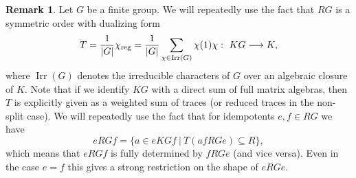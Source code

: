 \documentclass[11pt, a4paper]{amsart}
\theoremstyle{definition}
\theoremstyle{definition}
\newtheorem{remark}[theorem]{Remark}
\newcommand{\Irr}{\operatorname{Irr}}
\begin{document}
\begin{remark}\label{remark symm form}
    Let $G$ be a finite group. We will repeatedly use the fact that $RG$ is a symmetric order with dualizing form  
    \begin{equation}
        T=\frac{1}{|G|}\chi_{\rm reg}=\frac{1}{|G|}\sum_{\chi\in\Irr(G)}\chi(1)\chi:\ KG \longrightarrow K,
    \end{equation}
    where $\Irr(G)$ denotes the irreducible characters of $G$ over an algebraic closure of $K$.
    Note that if we identify $KG$ with a direct sum of full matrix algebras, then $T$ is explicitly given as a weighted sum of traces (or reduced traces in the non-split case). We will repeatedly use the fact that for idempotents $e,f\in RG$ we have 
    \begin{equation}
        eRGf = \{ a \in eKGf \ | \ T(afRGe) \subseteq R  \},
    \end{equation}
    which means that $eRGf$ is fully determined by $fRGe$ (and vice versa). Even in the case $e=f$ this gives a strong restriction on the shape of $eRGe$.
\end{remark}
\end{document}

